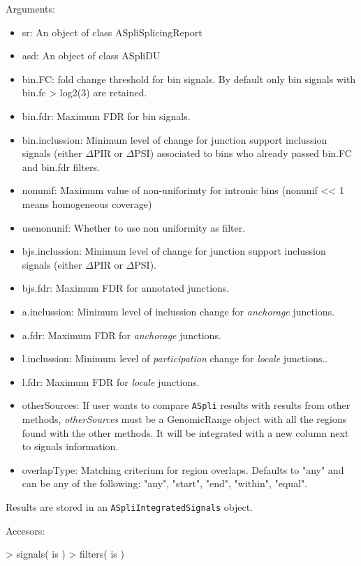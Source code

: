 \documentclass{article}
\begin{document}
Arguments:
\begin{itemize}
\item sr: An object of class ASpliSplicingReport
\item asd: An object of class ASpliDU
\item bin.FC: fold change threshold for bin signals. By default only bin signals with bin.fc > log2(3) are retained.
\item bin.fdr: Maximum FDR for bin signals.
\item bin.inclussion: Minimum level of change for junction support inclussion signals (either $\Delta$PIR or $\Delta$PSI) associated to bins who already passed bin.FC and bin.fdr filters.
\item nonunif: Maximum value of non-uniforimty for intronic bins (nonunif << 1 means homogeneous coverage)
\item usenonunif: Whether to use non uniformity as filter.
\item bjs.inclussion: Minimum level of change for junction support inclussion signals (either $\Delta$PIR or $\Delta$PSI).
\item bjs.fdr: Maximum FDR for annotated junctions.
\item a.inclussion:  Minimum level of inclussion change for {\em anchorage} junctions.
\item a.fdr: Maximum FDR for {\em anchorage} junctions.
\item l.inclussion: Minimum level of {\em participation} change for {\em locale} junctions..
\item l.fdr: Maximum FDR for {\em locale} junctions.
\item otherSources: If user wants to compare \texttt{ASpli} results with results from other methods, {\em otherSources} must be a GenomicRange object with all the regions found with the other methods. It will be integrated with a new column next to signals information.
\item overlapType: Matching criterium for region overlaps. Defaults to "any" and can be any of the following: "any", "start", "end", "within", "equal".
\end{itemize}

Results are stored in an \texttt{ASpliIntegratedSignals} object.

Accesors:

\begin{Schunk}
\begin{Sinput}
>  signals( is )
>  filters( is )
\end{Sinput}
\end{Schunk}
\end{document}
